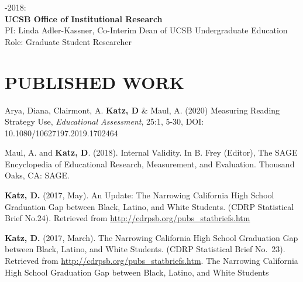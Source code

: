 \documentclass[12pt, oneside,]{memoir}
\begin{document}
-2018:\\
\textbf{UCSB Office of Institutional Research}\\
\hspace*{0.333em}\hspace*{0.333em}PI: Linda Adler-Kassner, Co-Interim
Dean of UCSB Undergraduate Education\\
\hspace*{0.333em}\hspace*{0.333em}Role: Graduate Student Researcher
\vspace{4mm}

\hypertarget{published-work}{%
\section{PUBLISHED WORK}\label{published-work}}
\begin{hangparas}{.25in}{1}
Arya, Diana, Clairmont, A. \textbf{Katz, D} \& Maul, A. (2020) Measuring
Reading Strategy Use, \emph{Educational  Assessment}, 25:1, 5-30, DOI:
10.1080/10627197.2019.1702464

\noindent Maul, A. and \textbf{Katz, D}. (2018). Internal Validity. In B. Frey
(Editor), The SAGE Encyclopedia of Educational Research, Measurement,
and Evaluation. Thousand Oaks, CA: SAGE.

\noindent \textbf{Katz, D.} (2017, May). An Update: The Narrowing California High
School Graduation Gap between Black, Latino, and White Students. (CDRP
Statistical Brief No.24). Retrieved from
\url{http://cdrpsb.org/pubs_statbriefs.htm}

\noindent \textbf{Katz, D.} (2017, March). The Narrowing California High School
Graduation Gap between Black, Latino, and White Students. (CDRP
Statistical Brief No.~23). Retrieved from
\url{http://cdrpsb.org/pubs_statbriefs.htm}. The Narrowing California
High School Graduation Gap between Black, Latino, and White Students
\end{hangparas}
\vspace{4mm}
\end{document}
